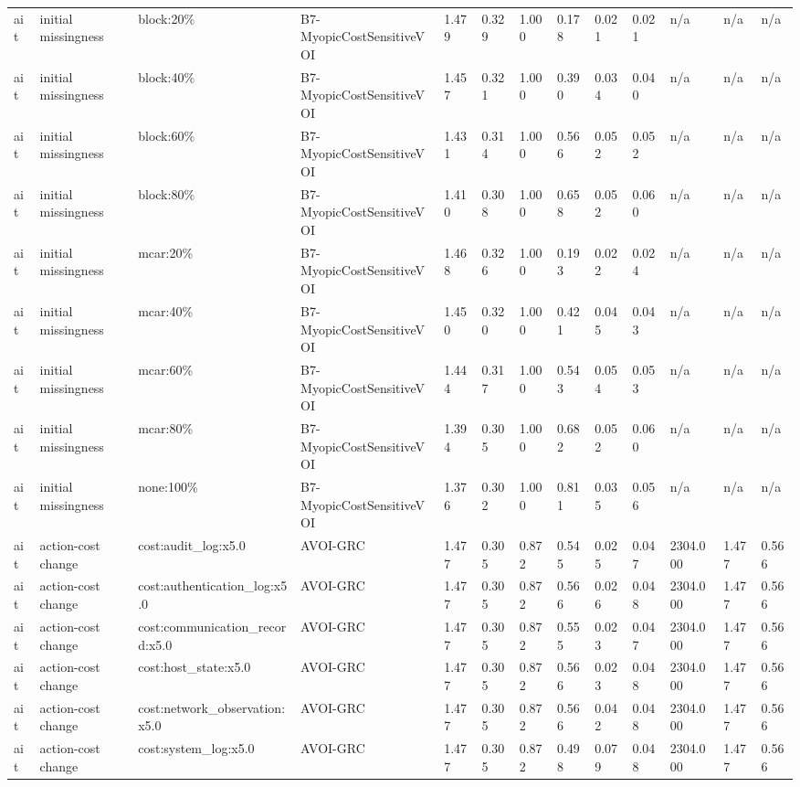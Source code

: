 \begin{table}[!ht]
{\begin{tabular}{lllllllllllll}
ait & initial missingness & block:20\% & B7-MyopicCostSensitiveVOI & 1.479 & 0.329 & 1.000 & 0.178 & 0.021 & 0.021 & n/a & n/a & n/a \\
ait & initial missingness & block:40\% & B7-MyopicCostSensitiveVOI & 1.457 & 0.321 & 1.000 & 0.390 & 0.034 & 0.040 & n/a & n/a & n/a \\
ait & initial missingness & block:60\% & B7-MyopicCostSensitiveVOI & 1.431 & 0.314 & 1.000 & 0.566 & 0.052 & 0.052 & n/a & n/a & n/a \\
ait & initial missingness & block:80\% & B7-MyopicCostSensitiveVOI & 1.410 & 0.308 & 1.000 & 0.658 & 0.052 & 0.060 & n/a & n/a & n/a \\
ait & initial missingness & mcar:20\% & B7-MyopicCostSensitiveVOI & 1.468 & 0.326 & 1.000 & 0.193 & 0.022 & 0.024 & n/a & n/a & n/a \\
ait & initial missingness & mcar:40\% & B7-MyopicCostSensitiveVOI & 1.450 & 0.320 & 1.000 & 0.421 & 0.045 & 0.043 & n/a & n/a & n/a \\
ait & initial missingness & mcar:60\% & B7-MyopicCostSensitiveVOI & 1.444 & 0.317 & 1.000 & 0.543 & 0.054 & 0.053 & n/a & n/a & n/a \\
ait & initial missingness & mcar:80\% & B7-MyopicCostSensitiveVOI & 1.394 & 0.305 & 1.000 & 0.682 & 0.052 & 0.060 & n/a & n/a & n/a \\
ait & initial missingness & none:100\% & B7-MyopicCostSensitiveVOI & 1.376 & 0.302 & 1.000 & 0.811 & 0.035 & 0.056 & n/a & n/a & n/a \\
ait & action-cost change & cost:audit\_log:x5.0 & AVOI-GRC & 1.477 & 0.305 & 0.872 & 0.545 & 0.025 & 0.047 & 2304.000 & 1.477 & 0.566 \\
ait & action-cost change & cost:authentication\_log:x5.0 & AVOI-GRC & 1.477 & 0.305 & 0.872 & 0.566 & 0.026 & 0.048 & 2304.000 & 1.477 & 0.566 \\
ait & action-cost change & cost:communication\_record:x5.0 & AVOI-GRC & 1.477 & 0.305 & 0.872 & 0.555 & 0.023 & 0.047 & 2304.000 & 1.477 & 0.566 \\
ait & action-cost change & cost:host\_state:x5.0 & AVOI-GRC & 1.477 & 0.305 & 0.872 & 0.566 & 0.023 & 0.048 & 2304.000 & 1.477 & 0.566 \\
ait & action-cost change & cost:network\_observation:x5.0 & AVOI-GRC & 1.477 & 0.305 & 0.872 & 0.566 & 0.042 & 0.048 & 2304.000 & 1.477 & 0.566 \\
ait & action-cost change & cost:system\_log:x5.0 & AVOI-GRC & 1.477 & 0.305 & 0.872 & 0.498 & 0.079 & 0.048 & 2304.000 & 1.477 & 0.566 \\

\end{tabular}}
\end{table}
